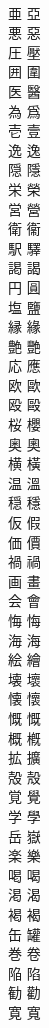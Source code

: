\documentclass[8pt]{extreport}
\begin{document}
\begin{CJK}{UTF8}{min}
\\	亜	亞
\\	悪	惡
\\	圧	壓
\\	囲	圍
\\	医	醫
\\	為	爲
\\	壱	壹
\\	逸	逸
\\	隠	隱
\\	栄	榮
\\	営	營
\\	衛	衞
\\	駅	驛
\\	謁	謁
\\	円	圓
\\	塩	鹽
\\	縁	緣
\\	艶	艷
\\	応	應
\\	欧	歐
\\	殴	毆
\\	桜	櫻
\\	奥	奧
\\	横	橫
\\	温	溫
\\	穏	穩
\\	仮	假
\\	価	價
\\	禍	禍
\\	画	畫
\\	会	會
\\	悔	悔
\\	海	海
\\	絵	繪
\\	壊	壞
\\	懐	懷
\\	慨	慨
\\	概	槪
\\	拡	擴
\\	殻	殼
\\	覚	覺
\\	学	學
\\	岳	嶽
\\	楽	樂
\\	喝	喝
\\	渇	渴
\\	褐	褐
\\	缶	罐
\\	巻	卷
\\	陥	陷
\\	勧	勸
\\	寛	寬

\end{CJK}
\end{document}
